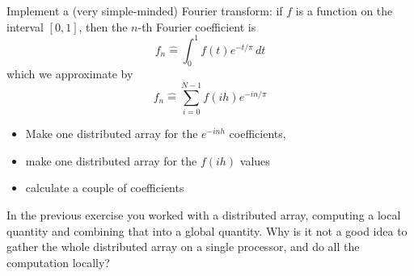 \begin{exercise}
  \label{ex:fft-vector}
  Implement a (very simple-minded) Fourier transform: if $f$ is a
  function on the interval $[0,1]$, then the $n$-th Fourier
  coefficient is
  \[ f_n\hat = \int_0^1 f(t)e^{-t/\pi}\,dt \]
  which we approximate by
  \[ f_n\hat = \sum_{i=0}^{N-1} f(ih)e^{-in/\pi} \]
  \begin{itemize}
  \item Make one distributed array for the $e^{-inh}$ coefficients,
  \item make one distributed array for the $f(ih)$ values
  \item calculate a couple of coefficients
  \end{itemize}
\end{exercise}

\begin{exercise}
  In the previous exercise you worked with a distributed array,
  computing a local quantity and combining that into a global
  quantity.
  Why is it not a good idea to gather the whole distributed array on a
  single processor, and do all the computation locally?
\end{exercise}

